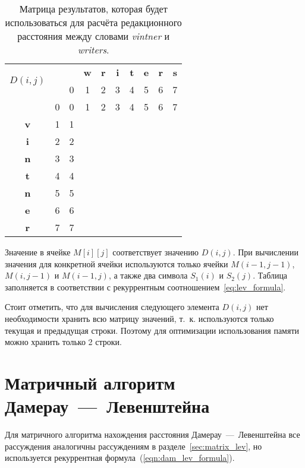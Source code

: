 \begin{table}[htb]
\caption{\centering Матрица результатов, которая будет использоваться для расчёта редакционного расстояния между словами \textit{vintner} и \textit{writers}.}
\small
\centering\begin{tabular}{|c|c|c|c|c|c|c|c|c|c|}
    \hline
    \multirow{2}{*}{$D(i,j)$} & \multirow{2}{*}{} & \multirow{1}{*}{} & \multirow{1}{*}{\textbf{w}} & \multirow{1}{*}{\textbf{r}} & \multirow{1}{*}{\textbf{i}} & \multirow{1}{*}{\textbf{t}} & \multirow{1}{*}{\textbf{e}} & \multirow{1}{*}{\textbf{r}} & \multirow{1}{*}{\textbf{s}} \\ \cline{3-10}
    & & 0 & 1 & 2 & 3 & 4 & 5 & 6 & 7 \\ \hline
    & 0 & 0 & 1 & 2 & 3 & 4 & 5 & 6 & 7 \\ \hline
    \textbf{v} & 1 & 1 & & & & & & & \\ \hline
    \textbf{i} & 2 & 2 & & & & & & & \\ \hline
    \textbf{n} & 3 & 3 & & & & & & & \\ \hline
    \textbf{t} & 4 & 4 & & & & & & & \\ \hline
    \textbf{n} & 5 & 5 & & & & & & & \\ \hline
    \textbf{e} & 6 & 6 & & & & & & & \\ \hline
    \textbf{r} & 7 & 7 & & & & & & & \\ \hline
\end{tabular}
\label{table:matrix}
\end{table}

Значение в ячейке \(M[i][j]\) соответствует значению \(D(i, j)\). При вычислении значения для конкретной ячейки используются только ячейки \(M(i - 1, j - 1)\), \(M(i, j - 1)\) и \(M(i - 1, j)\), а также два символа \(S_1(i)\) и \(S_2(j)\). Таблица заполняется в соответствии с рекуррентным соотношением~\ref{eq:lev_formula}.

Стоит отметить, что для вычисления следующего элемента \(D(i, j)\) нет необходимости хранить всю матрицу значений, т.~к. используются только текущая и предыдущая строки. Поэтому для оптимизации использования памяти можно хранить только 2 строки.

\section{Матричный алгоритм Дамерау~---~Левенштейна}

Для матричного алгоритма нахождения расстояния Дамерау~---~Левенштейна все рассуждения аналогичны рассуждениям в разделе~\ref{sec:matrix_lev}, но используется рекуррентная формула~(\ref{eqn:dam_lev_formula}).